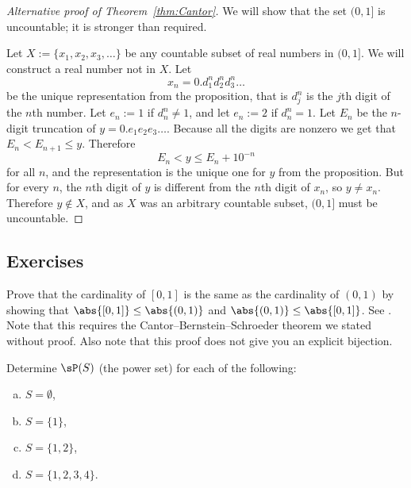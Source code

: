 \documentclass[12pt]{book}
\begin{document}
\begin{proof}[Alternative proof of Theorem~\ref{thm:Cantor}]
We will show that the set $(0,1]$ is uncountable;
it is stronger than required.

Let $X := \{ x_1,x_2,x_3,\ldots \}$ be any countable subset of real numbers in $(0,1]$.
We will construct a real number not in $X$.
Let
\begin{equation*}
x_n = 0.d_1^nd_2^nd_3^n\ldots
\end{equation*}
be the unique representation from the proposition, that is $d_j^n$ is the
$j$th digit of the $n$th number.
Let
$e_n := 1$ if $d_n^n \not= 1$, and 
let $e_n := 2$ if $d_n^n = 1$.
Let $E_n$ be the $n$-digit truncation of $y = 0.e_1e_2e_3\ldots$.
Because
all the digits are nonzero we get that $E_n < E_{n+1} \leq y$.
Therefore
\begin{equation*}
E_n < y \leq E_n + {10}^{-n} 
\end{equation*}
for all $n$, and the representation is the unique one for $y$ from 
the proposition.
But for every $n$, the $n$th digit
of $y$ is different from the $n$th digit of $x_n$, so $y \not= x_n$.
Therefore $y \notin X$, and as $X$ was an arbitrary countable subset,
$(0,1]$ must be uncountable.
\end{proof}

\subsection*{Exercises}

\begin{exercise}
Prove that the cardinality of $[0,1]$ is the same as the cardinality of
$(0,1)$ by showing that
$\abs{[0,1]} \leq \abs{(0,1)}$ and
$\abs{(0,1)} \leq \abs{[0,1]}$.
See 
.
Note that this requires the Cantor--Bernstein--Schroeder theorem we
stated without proof.
Also note that this proof does not give you an
explicit bijection.
\end{exercise}

\begin{exercise}
Determine $\sP(S)$ (the power set) for each of the following:
\begin{enumerate}[a)]
\item $S = \emptyset$,
\item $S = \{1\}$,
\item $S = \{1,2\}$,
\item $S = \{1,2,3,4\}$.
\end{enumerate}
\end{exercise}
\end{document}
